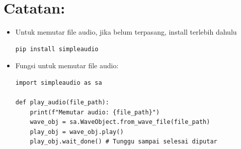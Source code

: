 \documentclass{article}
\begin{document}

\section*{Catatan:}

\begin{itemize}
    \item Untuk memutar file audio, jika belum terpasang, install terlebih dahulu
    \vspace{5mm}
    \begin{verbatim}
pip install simpleaudio
    \end{verbatim}
    \item Fungsi untuk memutar file audio:
    \vspace{5mm}
    \begin{verbatim}
import simpleaudio as sa

def play_audio(file_path):
    print(f"Memutar audio: {file_path}")
    wave_obj = sa.WaveObject.from_wave_file(file_path)
    play_obj = wave_obj.play()
    play_obj.wait_done() # Tunggu sampai selesai diputar
    \end{verbatim}
\end{itemize}
\end{document}
